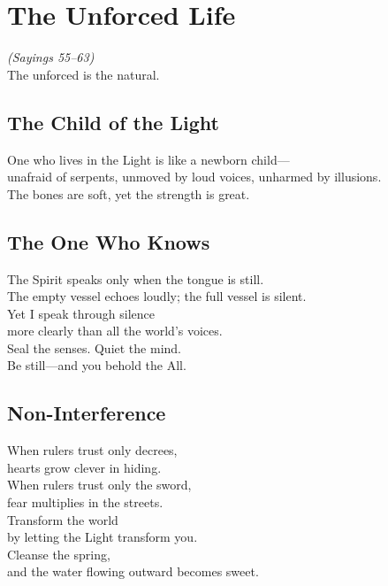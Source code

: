\documentclass[10pt, openright]{book}
\begin{document}
\chapter{The Unforced Life}
\begin{center}
    \textit{(Sayings 55--63)} \\
    \vspace{0.5cm}
    \small The unforced is the natural.
\end{center}
\vspace{0.5cm}

\section{The Child of the Light}
One who lives in the Light is like a newborn child— \\
unafraid of serpents, unmoved by loud voices, unharmed by illusions. \\
The bones are soft, yet the strength is great.

\section{The One Who Knows}
The Spirit speaks only when the tongue is still. \\
The empty vessel echoes loudly; the full vessel is silent. \\
Yet I speak through silence \\
more clearly than all the world's voices. \\

Seal the senses. Quiet the mind. \\
Be still—and you behold the All.

\section{Non-Interference}
When rulers trust only decrees, \\
hearts grow clever in hiding. \\
When rulers trust only the sword, \\
fear multiplies in the streets. \\

Transform the world \\
by letting the Light transform you. \\
Cleanse the spring, \\
and the water flowing outward becomes sweet.
\end{document}
